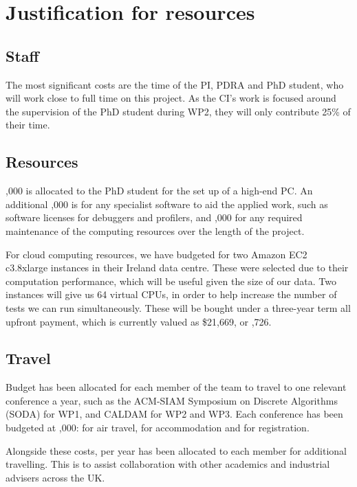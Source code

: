 \documentclass[a4paper,11pt]{article}
\begin{document}
    \section{Justification for resources}

    \subsection{Staff}

    The most significant costs are the time of the PI, PDRA and PhD student, who will work close to full time on this project. As the CI's work is focused around the supervision of the PhD student during WP2, they will only contribute 25\% of their time.

    \subsection{Resources}

    ,000 is allocated to the PhD student for the set up of a high-end PC. An additional ,000 is for any specialist software to aid the applied work, such as software licenses for debuggers and profilers, and ,000 for any required maintenance of the computing resources over the length of the project.

    For cloud computing resources, we have budgeted for two Amazon EC2 c3.8xlarge instances in their Ireland data centre. These were selected due to their computation performance, which will be useful given the size of our data. Two instances will give us 64 virtual CPUs, in order to help increase the number of tests we can run simultaneously. These will be bought under a three-year term all upfront payment, which is currently valued as \$21,669, or ,726.

    \subsection{Travel}

    Budget has been allocated for each member of the team to travel to one relevant conference a year, such as the ACM-SIAM Symposium on Discrete Algorithms (SODA) for WP1, and CALDAM for WP2 and WP3. Each conference has been budgeted at ,000:  for air travel,  for accommodation and  for registration.

    Alongside these costs,  per year has been allocated to each member for additional travelling. This is to assist collaboration with other academics and industrial advisers across the UK.
\end{document}
